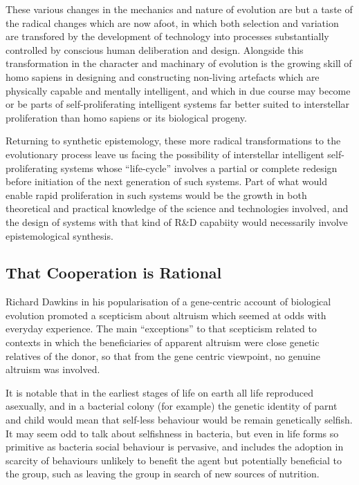 These various changes in the mechanics and nature of evolution are but a taste of the radical changes which are now afoot, in which both selection and variation are transfored by the development of technology into processes substantially controlled by conscious human deliberation and design.
Alongside this transformation in the character and machinary of evolution is the growing skill of homo sapiens in designing and constructing non-living artefacts which are physically capable and mentally intelligent, and which in due course may become or be parts of self-proliferating intelligent systems far better suited to interstellar proliferation than homo sapiens or its biological progeny.

Returning to synthetic epistemology, these more radical transformations to the evolutionary process leave us facing the possibility of interstellar intelligent self-proliferating systems whose ``life-cycle'' involves a partial or complete redesign before initiation of the next generation of such systems.
Part of what would enable rapid proliferation in such systems would be the growth in both theoretical and practical knowledge of the science and technologies involved, and the design of systems with that kind of R\&D capabiity would necessarily involve epistemological synthesis.

\subsection{That Cooperation is Rational}

Richard Dawkins in his popularisation of a gene-centric account of biological evolution \cite{dawkins-tsg} promoted a scepticism about altruism which seemed at odds with everyday experience.
The main ``exceptions'' to that scepticism related to contexts in which the beneficiaries of apparent altruism were close genetic relatives of the donor, so that from the gene centric viewpoint, no genuine altruism was involved.

It is notable that in the earliest stages of life on earth all life reproduced asexually, and in a bacterial colony (for example) the genetic identity of parnt and child would mean that self-less behaviour would be remain genetically selfish.
It may seem odd to talk about selfishness in bacteria, but even in life forms so primitive as bacteria social behaviour is pervasive, and includes the adoption in scarcity of behaviours unlikely to benefit the agent but potentially beneficial to the group, such as leaving the group in search of new sources of nutrition.

